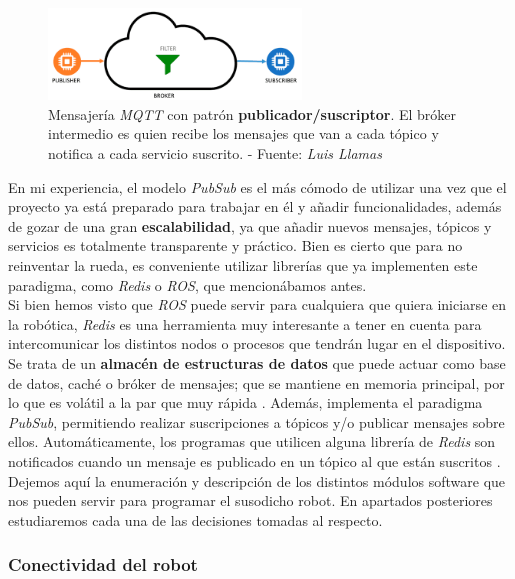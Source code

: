 \begin{figure}[h]
	\centering
	\includegraphics[width=0.6\textwidth]{imagenes/protocolos-iot-pubsub.png}
	\caption{Mensajería \textit{MQTT} con patrón \textbf{publicador/suscriptor}. El bróker intermedio es quien recibe los mensajes que van a cada tópico y notifica a cada servicio suscrito. - Fuente: \textit{Luis Llamas} \cite{mqtt-pubsub}}
	\label{iot-pubsub}
\end{figure}

En mi experiencia, el modelo \textit{PubSub} es el más cómodo de utilizar una vez que el proyecto ya está preparado para trabajar en él y añadir funcionalidades, además de gozar de una gran \textbf{escalabilidad}, ya que añadir nuevos mensajes, tópicos y servicios es totalmente transparente y práctico. Bien es cierto que para no reinventar la rueda, es conveniente utilizar librerías que ya implementen este paradigma, como \textit{Redis} o \textit{ROS}, que mencionábamos antes.\\

Si bien hemos visto que \textit{ROS} puede servir para cualquiera que quiera iniciarse en la robótica, \textit{Redis} es una herramienta muy interesante a tener en cuenta para intercomunicar los distintos nodos o procesos que tendrán lugar en el dispositivo. Se trata de un \textbf{almacén de estructuras de datos} que puede actuar como base de datos, caché o bróker de mensajes; que se mantiene en memoria principal, por lo que es volátil a la par que muy rápida \cite{redis}. Además, implementa el paradigma \textit{PubSub}, permitiendo realizar suscripciones a tópicos y/o publicar mensajes sobre ellos. Automáticamente, los programas que utilicen alguna librería de \textit{Redis} son notificados cuando un mensaje es publicado en un tópico al que están suscritos \cite{redis-pubsub}.\\

Dejemos aquí la enumeración y descripción de los distintos módulos software que nos pueden servir para programar el susodicho robot. En apartados posteriores estudiaremos cada una de las decisiones tomadas al respecto.\\


\subsubsection{Conectividad del robot}

